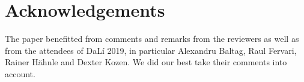 \documentclass{llncs}
\begin{document}
\section{Acknowledgements}
The paper benefitted from comments and remarks from the reviewers as well as from the attendees of DaL\'i 2019, 
in particular Alexandru Baltag, Raul Fervari, Rainer H\"ahnle and Dexter Kozen. 
We did our best take their comments into account. 


%


\end{document}
